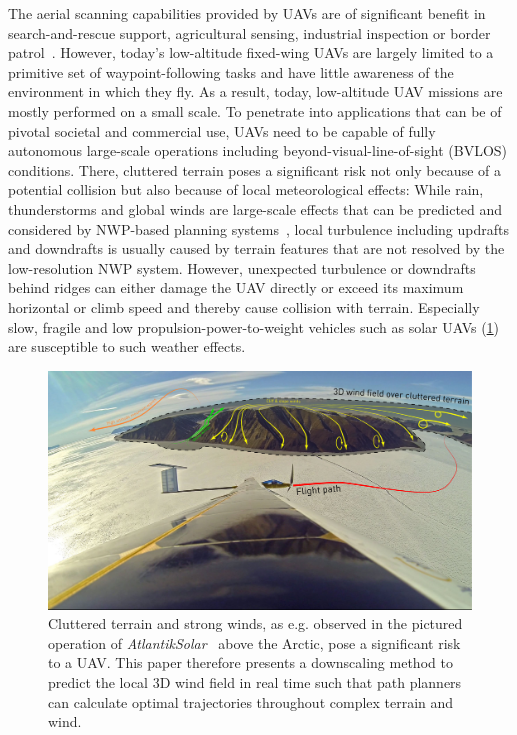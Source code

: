 \documentclass[twocolumn,letterpaper]{IEEEAerospaceCLS}
\begin{document}
The aerial scanning capabilities provided by \acp{UAV} are of significant benefit in search-and-rescue support, agricultural sensing, industrial inspection or border patrol~\cite{NASA_Pathfinder}. However, today's low-altitude fixed-wing \acp{UAV} are largely limited to a primitive set of waypoint-following tasks and have little awareness of the environment in which they fly. As a result, today, low-altitude \ac{UAV} missions are mostly performed on a small scale. To penetrate into applications that can be of pivotal societal and commercial use, UAVs need to be capable of fully autonomous large-scale operations including beyond-visual-line-of-sight (BVLOS) conditions. There, cluttered terrain poses a significant risk not only because of a potential collision but also because of local meteorological effects: While rain, thunderstorms and global winds are large-scale effects that can be predicted and considered by \ac{NWP}-based planning systems~\cite{Oettershagen2018Metpass}, local turbulence including updrafts and downdrafts is usually caused by terrain features that are not resolved by the low-resolution \ac{NWP} system. However, unexpected turbulence or downdrafts behind ridges can either damage the \ac{UAV} directly or exceed its maximum horizontal or climb speed and thereby cause collision with terrain. Especially slow, fragile and low propulsion-power-to-weight vehicles such as solar UAVs (\cref{fig:PL_Intro_Collage}) are susceptible to such weather effects.

\begin{figure}[htb]
\centering
\includegraphics[width=\columnwidth]{images/Introduction/Collage2}
\caption{
Cluttered terrain and strong winds, as e.g. observed in the pictured operation of \emph{AtlantikSolar}~\protect\cite{Oettershagen2018Metpass,Oettershagen_JFR2017} above the Arctic, pose a significant risk to a \ac{UAV}. This paper therefore presents a downscaling method to predict the local 3D wind field in real time such that path planners can calculate optimal trajectories throughout complex terrain and wind.
}
\label{fig:PL_Intro_Collage}
\end{figure}
\end{document}

